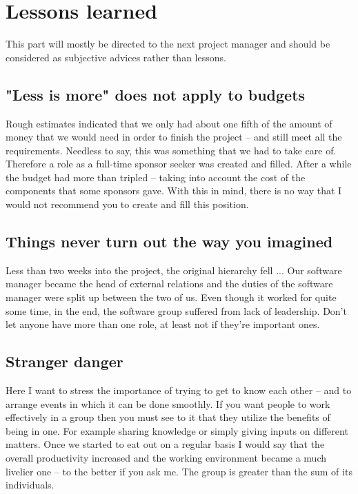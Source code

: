 
\section{Lessons learned}\label{sec:learnings}
This part will mostly be directed to the next project manager and should be considered as subjective advices rather than lessons.

\subsection{"Less is more" does not apply to budgets}
Rough estimates indicated that we only had about one fifth of the amount of money that we would need in order to finish the project -- and still meet all the requirements. Needless to say, this was something that we had to take care of. Therefore a role as a full-time sponsor seeker was created and filled. After a while the budget had more than tripled -- taking into account the cost of the components that some sponsors gave. With this in mind, there is no way that I would not recommend you to create and fill this position.
\subsection{Things never turn out the way you imagined}
Less than two weeks into the project, the original hierarchy fell ... Our software manager became the head of external relations and the duties of the software manager were split up between the two of us. Even though it worked for quite some time, in the end, the software group suffered from lack of leadership. Don't let anyone have more than one role, at least not if they're important ones.
\subsection{Stranger danger}
Here I want to stress the importance of trying to get to know each other -- and to arrange events in which it can be done smoothly. If you want people to work effectively in a group then you must see to it that they utilize the benefits of being in one. For example sharing knowledge or simply giving inputs on different matters.
Once we started to eat out on a regular basis I would say that the overall productivity increased and the working environment became a much livelier one -- to the better if you ask me. The group is greater than the sum of its individuals.
